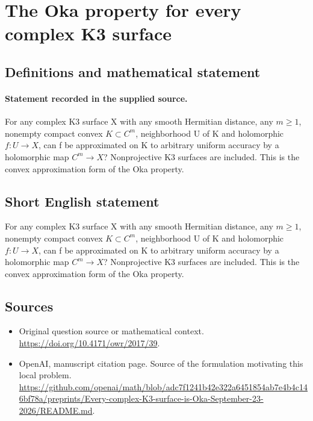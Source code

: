 \documentclass[11pt]{article}
\begin{document}
\section*{The Oka property for every complex K3 surface}\label{30007050}
\subsection{Definitions and mathematical statement}
\paragraph{Statement recorded in the supplied source.}
For any complex K3 surface X with any smooth Hermitian distance, any $m\geq 1$, nonempty compact convex $K\subset C^m$, neighborhood U of K and holomorphic $f:U\to X$, can f be approximated on K to arbitrary uniform accuracy by a holomorphic map $C^m\to X$? Nonprojective K3 surfaces are included. This is the convex approximation form of the Oka property.
\subsection{Short English statement}
For any complex K3 surface X with any smooth Hermitian distance, any $m\geq 1$, nonempty compact convex $K\subset C^m$, neighborhood U of K and holomorphic $f:U\to X$, can f be approximated on K to arbitrary uniform accuracy by a holomorphic map $C^m\to X$? Nonprojective K3 surfaces are included. This is the convex approximation form of the Oka property.
\subsection{Sources}
\begin{itemize}
\item[S1] Original question source or mathematical context.
\url{https://doi.org/10.4171/owr/2017/39}.
\item[S2] OpenAI, manuscript citation page. Source of the formulation motivating this local problem.
\url{https://github.com/openai/math/blob/adc7f1241b42e322a6451854ab7e4b4c146bf78a/preprints/Every-complex-K3-surface-is-Oka-September-23-2026/README.md}.
\end{itemize}
\end{document}

